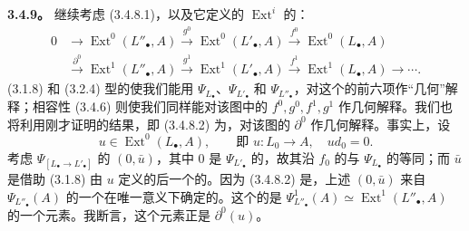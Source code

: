 \textbf{3.4.9。} 继续考虑 (3.4.8.1)，以及它定义的 $\operatorname{Ext}^i$ 的：
\[
\begin{aligned}
0&\longrightarrow\operatorname{Ext}^0(L''_\bullet,A)\xrightarrow{g^0}\operatorname{Ext}^0(L'_\bullet,A)
\xrightarrow{f^0}\operatorname{Ext}^0(L_\bullet,A)\\
&\xrightarrow{\partial^0}\operatorname{Ext}^1(L''_\bullet,A)\xrightarrow{g^1}\operatorname{Ext}^1(L'_\bullet,A)
\xrightarrow{f^1}\operatorname{Ext}^1(L_\bullet,A)\longrightarrow\cdots.
\end{aligned}\tag{3.4.9.1}
\]
(3.1.8) 和 (3.2.4) 型的使我们能用 $\Psi_{L_\bullet}$、$\Psi_{L'_\bullet}$ 和 $\Psi_{L''_\bullet}$，对这个的前六项作“几何”解释；相容性 (3.4.6) 则使我们同样能对该图中的
$f^0,g^0,f^1,g^1$ 作几何解释。我们也将利用刚才证明的结果，即 (3.4.8.2) 为，对该图的 $\partial^0$ 作几何解释。事实上，设
\[
u\in\operatorname{Ext}^0(L_\bullet,A),\qquad\text{即 }u:L_0\longrightarrow A,\quad ud_0=0.
\]
考虑 $\Psi_{[L_\bullet\to L'_\bullet]}$ 的 $(0,\bar u)$，其中 $0$ 是 $\Psi_{L'_\bullet}$ 的，故其沿 $f_0$ 的与 $\Psi_{L_\bullet}$ 的等同；而 $\bar u$ 是借助 (3.1.8) 由 $u$ 定义的后一个的。因为 (3.4.8.2) 是，上述 $(0,\bar u)$ 来自 $\Psi_{L''_\bullet}(A)$ 的一个在唯一意义下确定的。这个的是 $\Psi^1_{L''_\bullet}(A)\simeq\operatorname{Ext}^1(L''_\bullet,A)$ 的一个元素。我断言，这个元素正是 $\partial^0(u)$。

